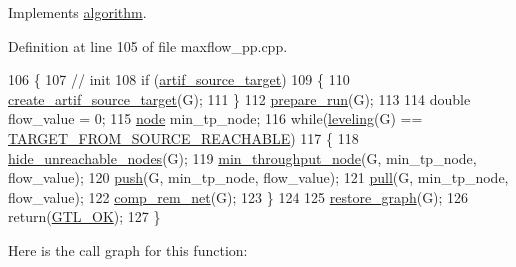 Implements \mbox{\hyperlink{classalgorithm_a734b189509a8d6b56b65f8ff772d43ca}{algorithm}}.



Definition at line 105 of file maxflow\+\_\+pp.\+cpp.


\begin{DoxyCode}
106 \{
107     \textcolor{comment}{// init}
108     \textcolor{keywordflow}{if} (\mbox{\hyperlink{classmaxflow__pp_a21263af726420d377e404d816f31ed45}{artif\_source\_target}})
109     \{
110     \mbox{\hyperlink{classmaxflow__pp_a02438e89291eeccda0b247d20ffa11e5}{create\_artif\_source\_target}}(G);
111     \}
112     \mbox{\hyperlink{classmaxflow__pp_a7a738741f8050df0cb0be0381aef0825}{prepare\_run}}(G);
113 
114     \textcolor{keywordtype}{double} flow\_value = 0;
115     \mbox{\hyperlink{classnode}{node}} min\_tp\_node;
116     \textcolor{keywordflow}{while}(\mbox{\hyperlink{classmaxflow__pp_adefb2cdc0145d57efd2d93c17a180896}{leveling}}(G) == \mbox{\hyperlink{classmaxflow__pp_abd042f1baa6a6200b5bbed755f400d2da54cf9dadeb9ec5994a80e0237d9f2872}{TARGET\_FROM\_SOURCE\_REACHABLE}})
117     \{
118     \mbox{\hyperlink{classmaxflow__pp_a93bb037fd3fc83c6558b560fc4da2340}{hide\_unreachable\_nodes}}(G);
119     \mbox{\hyperlink{classmaxflow__pp_a9f820f51329f0e0ec4d8123547ae6ebd}{min\_throughput\_node}}(G, min\_tp\_node, flow\_value);
120     \mbox{\hyperlink{classmaxflow__pp_ae7c9ce8d1cad511d70022e2f62567590}{push}}(G, min\_tp\_node, flow\_value);
121     \mbox{\hyperlink{classmaxflow__pp_aba2aefadd6dde920b8b8aa44af95ad9b}{pull}}(G, min\_tp\_node, flow\_value);
122     \mbox{\hyperlink{classmaxflow__pp_a97612b9517f0f11715610cb8faa81606}{comp\_rem\_net}}(G);
123     \}
124 
125     \mbox{\hyperlink{classmaxflow__pp_a273cc9bde3aeb47c08223da7458ed29d}{restore\_graph}}(G);
126     \textcolor{keywordflow}{return}(\mbox{\hyperlink{classalgorithm_af1a0078e153aa99c24f9bdf0d97f6710a5114c20e4a96a76b5de9f28bf15e282b}{GTL\_OK}});
127 \}
\end{DoxyCode}
Here is the call graph for this function\+:\nopagebreak
